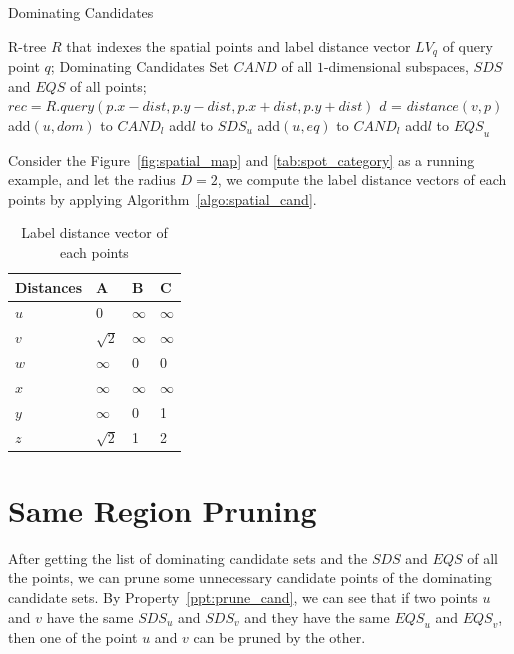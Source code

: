 \begin{algorithm}[H]
  \caption{Dominating Candidates}
  \label{algo:spatial_cand}
  \begin{algorithmic}[1]
  \show\LOOP
    \REQUIRE R-tree $R$ that indexes the spatial points and label distance vector $LV_q$ of query point $q$;
    \ENSURE Dominating Candidates Set $\mathit{CAND}$ of all $1$-dimensional subspaces, $\mathit{SDS}$ and $\mathit{EQS}$ of all points;
            \STATE $rec = R.query(p.x-dist, p.y-dist, p.x+dist, p.y+dist)$
                \STATE $d$ = $distance(v, p)$
                    \STATE add$(u, dom)$ to $\mathit{CAND}_l$
                    \STATE add$l$ to $\mathit{SDS}_u$
                \ENDIF
                    \STATE add$(u, eq)$ to $\mathit{CAND}_l$
                    \STATE add$l$ to $\mathit{EQS}_u$
                \ENDIF
            \ENDFOR
            
        \ENDFOR
    \ENDFOR
  \end{algorithmic}
\end{algorithm}

Consider the Figure~\ref{fig:spatial_map} and \ref{tab:spot_category} as a running example, and let the radius $D = 2$, we compute the label distance vectors of each points by applying Algorithm~\ref{algo:spatial_cand}.

\begin{table}[h]
    \centering
    \begin{tabular}{llll}
    \hline
    Distances & A & B & C \\ \hline
    $u$       & 0 & $\infty$ & $\infty$ \\ \hline
    $v$       & $\sqrt{2}$ & $\infty$ & $\infty$ \\ \hline
    $w$       & $\infty$ & 0 & 0 \\ \hline
    $x$       & $\infty$ & $\infty$ & $\infty$ \\ \hline
    $y$       & $\infty$ & 0 & 1 \\ \hline
    $z$       & $\sqrt{2}$ & 1 & 2 \\ \hline
    \end{tabular}
    \caption{Label distance vector of each points}
    \label{tab:lv_spatial}
\end{table}

\section{Same Region Pruning}
After getting the list of dominating candidate sets and the $\mathit{SDS}$ and $\mathit{EQS}$ of all the points, we can prune some unnecessary candidate points of the dominating candidate sets. By Property~\ref{ppt:prune_cand}, we can see that if two points $u$ and $v$ have the same $\mathit{SDS}_u$ and $\mathit{SDS}_v$ and they have the same $\mathit{EQS}_u$ and $\mathit{EQS}_v$, then one of the point $u$ and $v$ can be pruned by the other.

